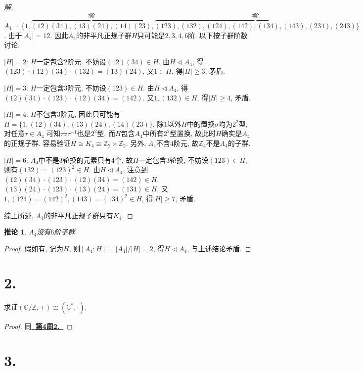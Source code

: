 \documentclass[12pt, a4paper, fontset=windows]{ctexart}
\newcommand{\C}{\mathbb{C}}
\newcommand{\Z}{\mathbb{Z}}
\newcommand{\abs}[1]{\left|{#1}\right|}
\newcommand{\isom}{\cong} %
\newcommand{\myref}[2][]{\hyperref[#1]{\bf\color{blue}\ {#2}\ }}
\newtheorem*{corollary}{推论}
\newenvironment{solution}{\begin{proof}[解]}{\end{proof}}
\begin{document}
\begin{solution}
$A_4=\{1,\overbrace{(12)(34),(13)(24),(14)(23)}^{2\text{阶}},\overbrace{(123),(132),(124),(142),(134),(143),(234),(243)}^{3\text{阶}}\}$. 
由于$\abs{A_4}=12$, 因此$A_4$的非平凡正规子群$H$只可能是$2,3,4,6$阶. 以下按子群阶数讨论. 

$\abs{H}=2$: $H$一定包含$2$阶元. 不妨设$(12)(34)\in H$. 由$H\lhd A_4$, 
得$(123)\cdot(12)(34)\cdot(132)=(13)(24)$. 又$1\in H$, 
得$\abs{H}\ge 3$, 矛盾. 

$\abs{H}=3$: $H$一定包含$3$阶元. 不妨设$(123)\in H$. 由$H\lhd A_4$, 
得$(12)(34)\cdot(123)\cdot(12)(34)=(142)$. 又$1,(132)\in H$, 
得$\abs{H}\ge 4$, 矛盾. 

$\abs{H}=4$: $H$不包含$3$阶元, 因此只可能有$H=\{1,(12)(34),(13)(24),(14)(23)\}$. 
除$1$以外$H$中的置换$\sigma$均为$2^2$型, 对任意$\tau\in A_4$
可知$\tau\sigma\tau^{-1}$也是$2^2$型, 而$H$包含$A_4$中所有$2^2$型置换, 
故此时$H$确实是$A_4$的正规子群. 容易验证$H\isom K_4\isom \Z_2\times\Z_2$. 
另外, $A_4$不含$4$阶元, 故$\Z_4$不是$A_4$的子群. 

$\abs{H}=6$: $A_4$中不是$3$轮换的元素只有$4$个, 故$H$一定包含$3$轮换, 
不妨设$(123)\in H$, 则有$(132)=(123)^2\in H$. 由$H\lhd A_4$, 
注意到$(12)(34)\cdot(123)\cdot(12)(34)=(142)\in H$, 
$(13)(24)\cdot(123)\cdot(13)(24)=(134)\in H$, 
又$1,(124)=(142)^2,(143)=(134)^2\in H$, 得$\abs{H}\ge 7$, 矛盾. 

综上所述, $A_4$的非平凡正规子群只有$K_4$. 
\end{solution}

\begin{corollary}
$A_4$没有$6$阶子群. 
\end{corollary}

\begin{proof}
假如有, 记为$H$, 则$[A_4:H]=\abs{A_4}/\abs{H}=2$, 
得$H\lhd A_4$, 与上述结论矛盾. 
\end{proof}

\section*{2.}

求证$(\C/\Z,+)\isom(\C^*,\cdot)$. 

\begin{proof}
同\myref[C-exp]{第4周2.}
\end{proof}

\section*{3.}
\end{document}
